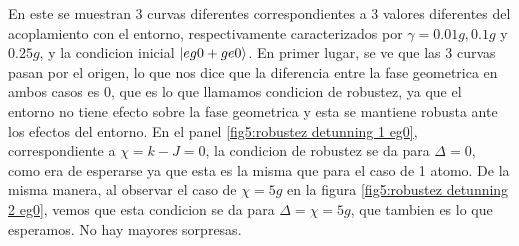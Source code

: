 En este se muestran 3 curvas diferentes correspondientes a 3 valores diferentes del acoplamiento con el entorno, respectivamente caracterizados por $\gamma=0.01g,0.1g$ y $0.25g$, y la condicion inicial $\ket{eg0+ge0}$. En primer lugar, se ve que las 3 curvas pasan por el origen, lo que nos dice que la diferencia entre la fase geometrica en ambos casos es 0, que es lo que llamamos condicion de robustez, ya que el entorno no tiene efecto sobre la fase geometrica y esta se mantiene robusta ante los efectos del entorno. En el panel \ref{fig5:robustez detunning 1 eg0}, correspondiente a $\chi=k-J=0$, la condicion de robustez se da para $\Delta=0$, como era de esperarse ya que esta es la misma que para el caso de 1 atomo. De la misma manera, al observar el caso de $\chi=5g$ en la figura \ref{fig5:robustez detunning 2 eg0}, vemos que esta condicion se da para $\Delta=\chi=5g$, que tambien es lo que esperamos. No hay mayores sorpresas. 

